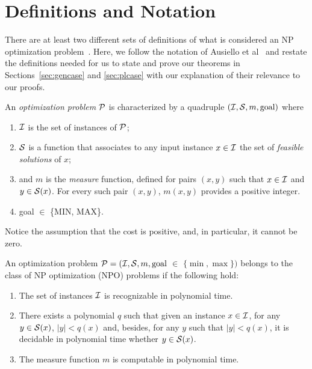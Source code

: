 \section{Definitions and Notation} \label{sec:prelim}

There are at least two different sets of definitions of what is considered an NP optimization problem~\cite{orponen1987approximation, ausiello1999complexity}. Here, we follow the notation of Ausiello et al~\cite{ausiello1999complexity} and restate the definitions needed for us to state and prove our theorems in Sections~\ref{sec:gencase} and \ref{sec:plcase} with our explanation of their relevance to our proofs.

\begin{definition}An {\em optimization problem} $\P$ is characterized by a quadruple $(\I,\S,m,\text{goal})$ where
\begin{enumerate}
\item $\I$ is the set of instances of $\P$;
\item $\S$ is a function that associates to any input instance $x\in\I$ the set of {\em feasible solutions} of $x$;
\item and $m$ is the {\em measure} function, defined for pairs $(x,y)$ such that $x\in\I$ and $y\in\S(x)$. For every such pair $(x,y)$, $m(x,y)$ provides a  positive integer.
\item goal $\in$ \{MIN, MAX\}.


\end{enumerate}
\end{definition}
\noindent
Notice the assumption that the cost is positive, and, in particular, it cannot be zero.


\begin{definition} An optimization problem $\P = (\I,\S,m, \text{goal}$ $\in$ $\{\min , \max\} )$ belongs to the class of NP optimization (NPO) problems if the following hold:
\begin{enumerate}
\item The set of instances $\I$ is recognizable in polynomial time.
\item There exists a polynomial $q$ such that given an instance $x\in\I$, for any $y\in \S(x)$, $|y| < q(x)$ and, besides, for any $y$ such that $|y| < q(x)$, it is decidable in polynomial time whether $y\in\S(x)$.
\item The measure function $m$ is computable in polynomial time.
\end{enumerate}
\end{definition}

